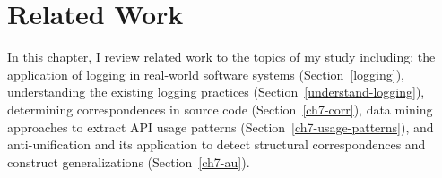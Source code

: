 \chapter{Related Work}  \label{rw}
In this chapter, I review related work to the topics of my study including: the application of logging in real-world software systems (Section~\ref{logging}), understanding the existing logging practices (Section~\ref{understand-logging}),
 determining correspondences in source code (Section~\ref{ch7-corr}), data mining approaches to extract API usage patterns (Section~\ref{ch7-usage-patterns}), and anti-unification and its application to detect structural correspondences and construct generalizations (Section~\ref{ch7-au}). %

